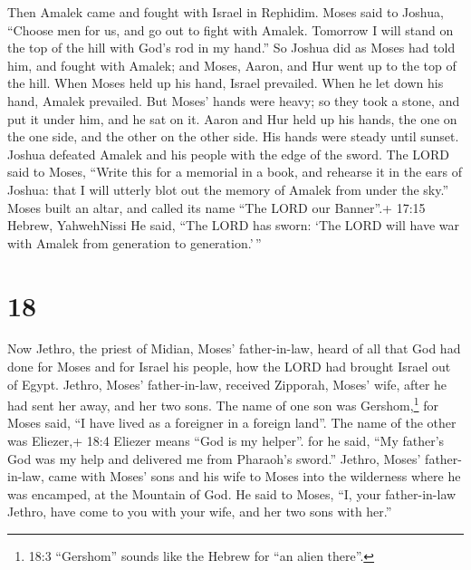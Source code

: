  Then Amalek came and fought with Israel in Rephidim.
 Moses said to Joshua, ``Choose men for us, and go out to
fight with Amalek. Tomorrow I will stand on the top of the hill with
God's rod in my hand.''  So Joshua did as Moses had told
him, and fought with Amalek; and Moses, Aaron, and Hur went up to the
top of the hill.  When Moses held up his hand, Israel
prevailed. When he let down his hand, Amalek prevailed. 
But Moses' hands were heavy; so they took a stone, and put it under him,
and he sat on it. Aaron and Hur held up his hands, the one on the one
side, and the other on the other side. His hands were steady until
sunset.  Joshua defeated Amalek and his people with the
edge of the sword.  The LORD said to Moses, ``Write this
for a memorial in a book, and rehearse it in the ears of Joshua: that I
will utterly blot out the memory of Amalek from under the sky.''
 Moses built an altar, and called its name ``The LORD our
Banner''.+ 17:15 Hebrew, YahwehNissi  He said, ``The LORD
has sworn: `The LORD will have war with Amalek from generation to
generation.'\,''

\hypertarget{section-17}{%
\section{18}\label{section-17}}

 Now Jethro, the priest of Midian, Moses' father-in-law,
heard of all that God had done for Moses and for Israel his people, how
the LORD had brought Israel out of Egypt.  Jethro, Moses'
father-in-law, received Zipporah, Moses' wife, after he had sent her
away,  and her two sons. The name of one son was
Gershom,\footnote{18:3 ``Gershom'' sounds like the Hebrew for ``an alien
  there''.} for Moses said, ``I have lived as a foreigner in a foreign
land''.  The name of the other was Eliezer,+ 18:4 Eliezer
means ``God is my helper''. for he said, ``My father's God was my help
and delivered me from Pharaoh's sword.''  Jethro, Moses'
father-in-law, came with Moses' sons and his wife to Moses into the
wilderness where he was encamped, at the Mountain of God. 
He said to Moses, ``I, your father-in-law Jethro, have come to you with
your wife, and her two sons with her.''

